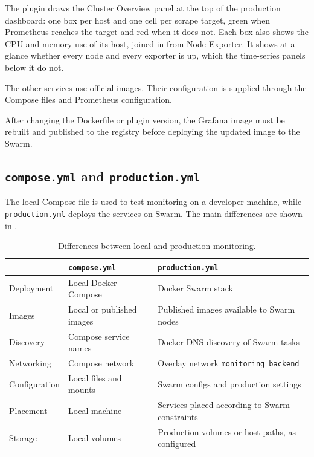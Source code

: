 The plugin draws the Cluster Overview panel at the top of the
production dashboard: one box per host and one cell per scrape
target, green when Prometheus reaches the target and red when it does
not. Each box also shows the CPU and memory use of its host, joined in
from Node Exporter. It shows at a glance whether every node and every
exporter is up, which the time-series panels below it do not.

The other services use official images. Their configuration is supplied
through the Compose files and Prometheus configuration.

After changing the Dockerfile or plugin version, the Grafana image
must be rebuilt and published to the registry before deploying the
updated image to the Swarm.

\subsection{\texttt{compose.yml} and \texttt{production.yml}}
The local Compose file is used to test monitoring on a developer
machine, while \texttt{production.yml} deploys the services on Swarm.
The main differences are shown in .
\begin{table}[htbp]
\centering
\caption{Differences between local and production monitoring.}
\label{tab:stats-diff}
\small
\begin{tabular}{>{\raggedright\arraybackslash}p{28mm}>{\raggedright\arraybackslash}p{49mm}>{\raggedright\arraybackslash}p{51mm}}
\toprule
& \texttt{compose.yml} & \texttt{production.yml} \\
\midrule
Deployment & Local Docker Compose
& Docker Swarm stack \\
Images & Local or published images
& Published images available to Swarm nodes \\
Discovery & Compose service names
& Docker DNS discovery of Swarm tasks \\
Networking & Compose network
& Overlay network \texttt{monitoring\_backend} \\
Configuration & Local files and mounts
& Swarm configs and production settings \\
Placement & Local machine
& Services placed according to Swarm constraints \\
Storage & Local volumes
& Production volumes or host paths, as configured \\
\bottomrule
\end{tabular}
\end{table}

